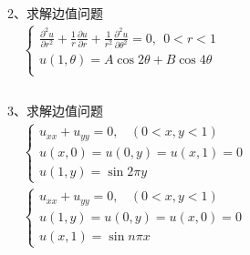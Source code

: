  ~~~\hspace*{\fill} \\
2、求解边值问题\\
	$\displaystyle  \begin{array}{lllllllll}
	&\begin{cases}
	\frac{\partial^2 u }{\partial r^2 } +\frac{1}{r } \frac{\partial u }{\partial r } +
	\frac{1}{r^2 } \frac{\partial ^2 u }{\partial \theta ^2  } =0, ~~ 0<r<1\\
	u(1,\theta)= A\cos 2 \theta +B \cos 4 \theta \\	
\end{cases} \\	
\end{array}$ \\ 

 ~~~\hspace*{\fill} \\
3、求解边值问题\\
$\begin{array}{lllllllll}
	& \begin{cases}
		u_{xx} +u_{yy} =0 ,~~~~ (0<x, y<1)\\
		u(x,0)= u(0,y)=u(x,1)= 0 \\
		u(1,y)= \sin 2\pi y
	\end{cases}\\	
	&\begin{cases}
		u_{xx} +u_{yy} =0 ,~~~~ (0<x, y<1)\\
		u(1,y)= u(0,y)=u(x,0)= 0 \\
		u(x,1)= \sin n\pi x
	\end{cases} \\	
\end{array}$ \\ 


